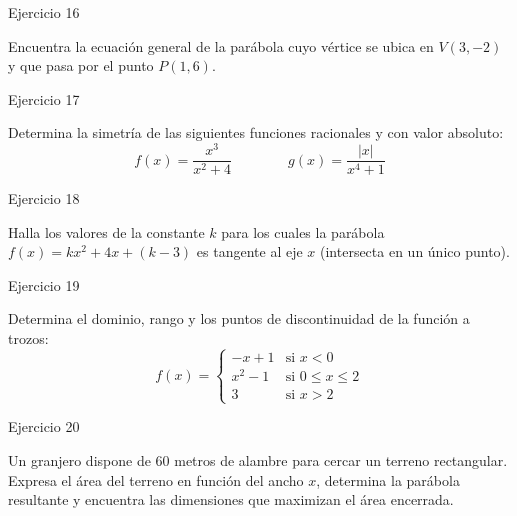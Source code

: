\documentclass[aspectratio=169]{beamer}
\begin{document}
\begin{frame}{Ejercicio 16}
  \begin{mwejercicio}
    Encuentra la ecuación general de la parábola cuyo vértice se ubica en $V(3, -2)$ y que pasa por el punto $P(1, 6)$.
  \end{mwejercicio}
  \vspace{3.5cm}
\end{frame}
\begin{frame}{Ejercicio 17}
  \begin{mwejercicio}
    Determina la simetría de las siguientes funciones racionales y con valor absoluto:
    $$f(x) = \frac{x^3}{x^2 + 4} \qquad\qquad g(x) = \frac{|x|}{x^4 + 1}$$
  \end{mwejercicio}
  \vspace{3.5cm}
\end{frame}
\begin{frame}{Ejercicio 18}
  \begin{mwejercicio}
    Halla los valores de la constante $k$ para los cuales la parábola $f(x) = kx^2 + 4x + (k - 3)$ es tangente al eje $x$ (intersecta en un único punto).
  \end{mwejercicio}
  \vspace{3.5cm}
\end{frame}
\begin{frame}{Ejercicio 19}
  \begin{mwejercicio}
    Determina el dominio, rango y los puntos de discontinuidad de la función a trozos:
    $$f(x) = \begin{cases}
      -x + 1 & \text{si } x < 0 \\
      x^2 - 1 & \text{si } 0 \le x \le 2 \\
      3 & \text{si } x > 2
    \end{cases}$$
  \end{mwejercicio}
  \vspace{3.5cm}
\end{frame}
\begin{frame}{Ejercicio 20}
  \begin{mwejercicio}
    Un granjero dispone de 60 metros de alambre para cercar un terreno rectangular. Expresa el área del terreno en función del ancho $x$, determina la parábola resultante y encuentra las dimensiones que maximizan el área encerrada.
  \end{mwejercicio}
  \vspace{3.5cm}
\end{frame}
\end{document}

